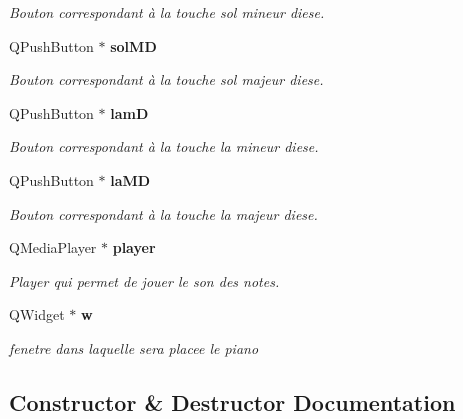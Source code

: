 \begin{DoxyCompactItemize}
\begin{DoxyCompactList}\small\item\em Bouton correspondant à la touche sol mineur diese. \end{DoxyCompactList}\item 
Q\-Push\-Button $\ast$ {\bf sol\-M\-D}\label{class_clavier_piano_a261ac980129f3cfeeab43952fe76ea08}

\begin{DoxyCompactList}\small\item\em Bouton correspondant à la touche sol majeur diese. \end{DoxyCompactList}\item 
Q\-Push\-Button $\ast$ {\bf lam\-D}\label{class_clavier_piano_a22cb769fba737e2c86d73205635b2a7f}

\begin{DoxyCompactList}\small\item\em Bouton correspondant à la touche la mineur diese. \end{DoxyCompactList}\item 
Q\-Push\-Button $\ast$ {\bf la\-M\-D}\label{class_clavier_piano_a747ab99bc7db016f676adf49ae0f7a32}

\begin{DoxyCompactList}\small\item\em Bouton correspondant à la touche la majeur diese. \end{DoxyCompactList}\item 
Q\-Media\-Player $\ast$ {\bf player}\label{class_clavier_piano_ac9b473b766ffe07422aa68cc7d295de3}

\begin{DoxyCompactList}\small\item\em Player qui permet de jouer le son des notes. \end{DoxyCompactList}\item 
Q\-Widget $\ast$ {\bf w}\label{class_clavier_piano_aaea71e40c5e2edffb0c80a3c571953a0}

\begin{DoxyCompactList}\small\item\em fenetre dans laquelle sera placee le piano \end{DoxyCompactList}\end{DoxyCompactItemize}


\subsection{Constructor \& Destructor Documentation}
